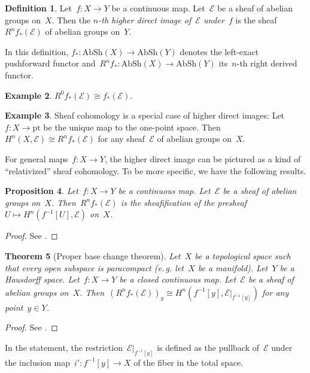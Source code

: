 \documentclass[10pt]{amsart}
\makeatletter
\theoremstyle{definition}
\newtheorem{defn}{Definition}[section]
\newtheorem{ex}[defn]{Example}
\theoremstyle{plain}
\newtheorem{prop}[defn]{Proposition}
\newtheorem{thm}[defn]{Theorem}
\theoremstyle{remark}
\newcommand{\E}{\mathcal{E}}
\newcommand{\AbSh}{\mathrm{AbSh}}
\newcommand{\eg}{e.\,g.\@\xspace}
\newcommand{\pt}{\mathrm{pt}}
\newcommand{\stackhref}[1]{\href{http://stacks.math.columbia.edu/tag/#1}{#1}}
\makeatother
\begin{document}
\begin{defn}Let~$f : X \to Y$ be a continuous map. Let~$\E$ be a sheaf of
abelian groups on~$X$. Then the \emph{$n$-th higher direct image of~$\E$
under~$f$} is the sheaf~$R^n f_*(\E)$ of abelian groups on~$Y$.\end{defn}

In this definition, $f_* : \AbSh(X) \to \AbSh(Y)$ denotes the left-exact
pushforward functor and~$R^n f_* : \AbSh(X) \to \AbSh(Y)$ its~$n$-th right
derived functor.

\begin{ex}$R^0 f_*(\E) \cong f_*(\E)$.\end{ex}

\begin{ex}Sheaf cohomology is a special case of higher direct images: Let~$f : X
\to \pt$ be the unique map to the one-point space. Then~$H^n(X,\E) \cong R^n
f_*(\E)$ for any sheaf~$\E$ of abelian groups on~$X$.\end{ex}

For general maps~$f : X \to Y$, the higher direct image can be pictured as a
kind of ``relativized'' sheaf cohomology. To be more specific, we have the
following results.

\begin{prop}Let~$f : X \to Y$ be a continuous map. Let~$\E$ be a sheaf of
abelian groups on~$X$. Then~$R^n f_*(\E)$ is the sheafification of the
presheaf~$U \mapsto H^n(f^{-1}[U], \E)$ on~$X$.\end{prop}

\begin{proof}See \cite[Lemma~\stackhref{01E4}]{stacks-project}.
\end{proof}

\begin{thm}[Proper base change theorem]Let~$X$ be a topological space such
that every open subspace is paracompact (\eg let~$X$ be a manifold). Let~$Y$ be
a Hausdorff space. Let~$f : X \to Y$ be a closed continuous map. Let~$\E$ be a
sheaf of abelian groups on~$X$. Then~$(R^n f_*(\E))_y \cong H^n(f^{-1}[y],
\E|_{f^{-1}[y]})$ for any point~$y \in Y$.\end{thm}

\begin{proof}See \cite[Thm.~8.11]{wedhorn}.\end{proof}

In the statement, the restriction~$\E|_{f^{-1}[y]}$ is defined as the pullback
of~$\E$ under the inclusion map~$i' : f^{-1}[y] \to X$ of the fiber in the
total space.
\end{document}
